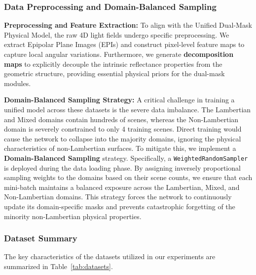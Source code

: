 \documentclass[lettersize,journal]{IEEEtran}
\begin{document}
\subsubsection{Data Preprocessing and Domain-Balanced Sampling}

\textbf{Preprocessing and Feature Extraction:} 
To align with the Unified Dual-Mask Physical Model, the raw 4D light fields undergo specific preprocessing. We extract Epipolar Plane Images (EPIs) \cite{ref} and construct pixel-level feature maps to capture local angular variations. Furthermore, we generate \textbf{decomposition maps} to explicitly decouple the intrinsic reflectance properties from the geometric structure, providing essential physical priors for the dual-mask modules.

\textbf{Domain-Balanced Sampling Strategy:} 
A critical challenge in training a unified model across these datasets is the severe data imbalance. The Lambertian and Mixed domains contain hundreds of scenes, whereas the Non-Lambertian domain is severely constrained to only 4 training scenes. Direct training would cause the network to collapse into the majority domains, ignoring the physical characteristics of non-Lambertian surfaces. To mitigate this, we implement a \textbf{Domain-Balanced Sampling} strategy. Specifically, a \texttt{WeightedRandomSampler} \cite{ref} is deployed during the data loading phase. By assigning inversely proportional sampling weights to the domains based on their scene counts, we ensure that each mini-batch maintains a balanced exposure across the Lambertian, Mixed, and Non-Lambertian domains. This strategy forces the network to continuously update its domain-specific masks and prevents catastrophic forgetting of the minority non-Lambertian physical properties.

\subsubsection{Dataset Summary}

The key characteristics of the datasets utilized in our experiments are summarized in Table~\ref{tab:datasets}.
\end{document}
